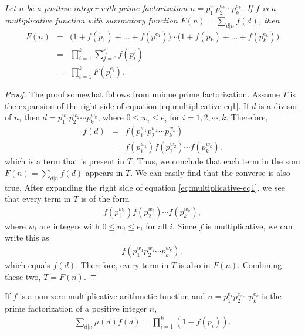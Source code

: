 \documentclass[12pt]{subfile}
\begin{document}
		\begin{theorem}\slshape\label{thm:sumfunction}
			Let $n$ be a positive integer with prime factorization $n=p_1^{e_1}p_2^{e_2} \cdots p_k^{e_k}$. If $f$ is a multiplicative function with summatory function $F(n)=\sum\limits_{d|n}f(d)$, then
				\begin{eqnarray}
					F(n)
					& = &
					\Big(1+f(p_1)+\ldots+f\left(p_1^{e_1}\right)\Big)\cdots\Big(1+f(p_k)+\ldots+f\left(p_k^{e_k}\right)\Big) \label{eq:multiplicative-eq1}\\
					& = &
					\prod_{i=1}^k\sum_{j=0}^{e_i}f\left(p_i^j\right) \nonumber\\
					& = & \prod_{i=1}^kF\left(p_i^{e_i}\right).\nonumber
				\end{eqnarray}
		\end{theorem}
		
		\begin{proof}
			The proof somewhat follows from unique prime factorization. Assume $T$ is the expansion of the right side of equation \eqref{eq:multiplicative-eq1}.
			If $d$ is a divisor of $n$, then $d=p_1^{w_1}p_2^{w_2}\cdots p_k^{w_k}$, where $0\leq w_i\leq e_i$ for $i=1,2,\cdots,k$. Therefore,
				\begin{eqnarray*}
					f(d)    & = & f\left(p_1^{w_1}p_2^{w_2}\cdots p_k^{w_k}\right)\\
							& = & f\left(p_1^{w_1}\right) f\left(p_2^{w_2}\right)\cdots f\left(p_k^{w_k}\right).
				\end{eqnarray*}
			which is a term that is present in $T$. Thus, we conclude that each term in the sum $F(n)=\sum\limits_{d|n}f(d)$ appears in $T$. We can easily find that the converse is also true. After expanding the right side of equation \eqref{eq:multiplicative-eq1}, we see that every term in $T$ is of the form 
				\begin{align*}
					f\left(p_1^{w_1}\right)	f\left(p_2^{w_2}\right)\cdots f\left(p_k^{w_k}\right),
				\end{align*}
			where $w_i$ are integers with $0 \leq w_i \leq e_i$ for all $i$. Since $f$ is multiplicative, we can write this as
				\begin{align*}
					f\left(p_1^{w_1}p_2^{w_2}\cdots p_k^{w_k}\right),
				\end{align*}
			which equals $f(d)$. Therefore, every term in $T$ is also in $F(n)$. Combining these two, $T=F(n)$.
		\end{proof}
		

		
		\begin{corollary}
			If $f$ is a non-zero multiplicative arithmetic function and $n=p_1^{e_1}p_2^{e_2} \cdots p_k^{e_k}$ is the prime factorization of a positive integer $n$,
				\begin{align*}
					\sum\limits_{d|n}\mu(d)f(d) = \prod_{i=1}^{k} (1-f(p_i)).
				\end{align*}
		\end{corollary}
		
\end{document}
